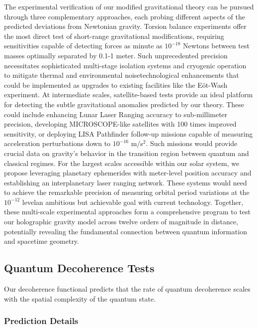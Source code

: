 \documentclass[11pt,english,twoside]{article}
\begin{document}
The experimental verification of our modified gravitational theory can be pursued through three complementary approaches, each probing different aspects of the predicted deviations from Newtonian gravity. Torsion balance experiments offer the most direct test of short-range gravitational modifications, requiring sensitivities capable of detecting forces as minute as $10^{-18}$ Newtons between test masses optimally separated by 0.1-1 meter. Such unprecedented precision necessitates sophisticated multi-stage isolation systems and cryogenic operation to mitigate thermal and environmental noise\textemdash{}technological enhancements that could be implemented as upgrades to existing facilities like the E\"ot-Wash experiment. At intermediate scales, satellite-based tests provide an ideal platform for detecting the subtle gravitational anomalies predicted by our theory. These could include enhancing Lunar Laser Ranging accuracy to sub-millimeter precision, developing MICROSCOPE-like satellites with 100 times improved sensitivity, or deploying LISA Pathfinder follow-up missions capable of measuring acceleration perturbations down to $10^{-16}$ m/s$^{2}$. Such missions would provide crucial data on gravity's behavior in the transition region between quantum and classical regimes. For the largest scales accessible within our solar system, we propose leveraging planetary ephemerides with meter-level position accuracy and establishing an interplanetary laser ranging network. These systems would need to achieve the remarkable precision of measuring orbital period variations at the $10^{-12}$ level\textemdash{}an ambitious but achievable goal with current technology. Together, these multi-scale experimental approaches form a comprehensive program to test our holographic gravity model across twelve orders of magnitude in distance, potentially revealing the fundamental connection between quantum information and spacetime geometry.

\subsection{Quantum Decoherence Tests}

Our decoherence functional predicts that the rate of quantum decoherence scales with the spatial complexity of the quantum state.

\subsubsection{Prediction Details}
\end{document}
